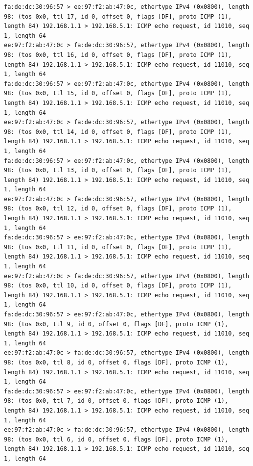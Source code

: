 \documentclass[a4paper,12pt]{article}
\begin{document}
\begin{Verbatim}
fa:de:dc:30:96:57 > ee:97:f2:ab:47:0c, ethertype IPv4 (0x0800), length 98: (tos 0x0, ttl 17, id 0, offset 0, flags [DF], proto ICMP (1), length 84) 192.168.1.1 > 192.168.5.1: ICMP echo request, id 11010, seq 1, length 64
ee:97:f2:ab:47:0c > fa:de:dc:30:96:57, ethertype IPv4 (0x0800), length 98: (tos 0x0, ttl 16, id 0, offset 0, flags [DF], proto ICMP (1), length 84) 192.168.1.1 > 192.168.5.1: ICMP echo request, id 11010, seq 1, length 64
fa:de:dc:30:96:57 > ee:97:f2:ab:47:0c, ethertype IPv4 (0x0800), length 98: (tos 0x0, ttl 15, id 0, offset 0, flags [DF], proto ICMP (1), length 84) 192.168.1.1 > 192.168.5.1: ICMP echo request, id 11010, seq 1, length 64
ee:97:f2:ab:47:0c > fa:de:dc:30:96:57, ethertype IPv4 (0x0800), length 98: (tos 0x0, ttl 14, id 0, offset 0, flags [DF], proto ICMP (1), length 84) 192.168.1.1 > 192.168.5.1: ICMP echo request, id 11010, seq 1, length 64
fa:de:dc:30:96:57 > ee:97:f2:ab:47:0c, ethertype IPv4 (0x0800), length 98: (tos 0x0, ttl 13, id 0, offset 0, flags [DF], proto ICMP (1), length 84) 192.168.1.1 > 192.168.5.1: ICMP echo request, id 11010, seq 1, length 64
ee:97:f2:ab:47:0c > fa:de:dc:30:96:57, ethertype IPv4 (0x0800), length 98: (tos 0x0, ttl 12, id 0, offset 0, flags [DF], proto ICMP (1), length 84) 192.168.1.1 > 192.168.5.1: ICMP echo request, id 11010, seq 1, length 64
fa:de:dc:30:96:57 > ee:97:f2:ab:47:0c, ethertype IPv4 (0x0800), length 98: (tos 0x0, ttl 11, id 0, offset 0, flags [DF], proto ICMP (1), length 84) 192.168.1.1 > 192.168.5.1: ICMP echo request, id 11010, seq 1, length 64
ee:97:f2:ab:47:0c > fa:de:dc:30:96:57, ethertype IPv4 (0x0800), length 98: (tos 0x0, ttl 10, id 0, offset 0, flags [DF], proto ICMP (1), length 84) 192.168.1.1 > 192.168.5.1: ICMP echo request, id 11010, seq 1, length 64
fa:de:dc:30:96:57 > ee:97:f2:ab:47:0c, ethertype IPv4 (0x0800), length 98: (tos 0x0, ttl 9, id 0, offset 0, flags [DF], proto ICMP (1), length 84) 192.168.1.1 > 192.168.5.1: ICMP echo request, id 11010, seq 1, length 64
ee:97:f2:ab:47:0c > fa:de:dc:30:96:57, ethertype IPv4 (0x0800), length 98: (tos 0x0, ttl 8, id 0, offset 0, flags [DF], proto ICMP (1), length 84) 192.168.1.1 > 192.168.5.1: ICMP echo request, id 11010, seq 1, length 64
fa:de:dc:30:96:57 > ee:97:f2:ab:47:0c, ethertype IPv4 (0x0800), length 98: (tos 0x0, ttl 7, id 0, offset 0, flags [DF], proto ICMP (1), length 84) 192.168.1.1 > 192.168.5.1: ICMP echo request, id 11010, seq 1, length 64
ee:97:f2:ab:47:0c > fa:de:dc:30:96:57, ethertype IPv4 (0x0800), length 98: (tos 0x0, ttl 6, id 0, offset 0, flags [DF], proto ICMP (1), length 84) 192.168.1.1 > 192.168.5.1: ICMP echo request, id 11010, seq 1, length 64

\end{Verbatim}
\end{document}
